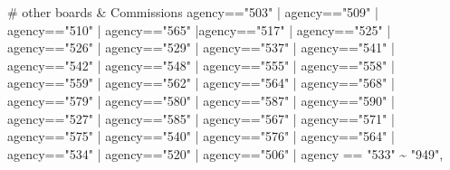 \documentclass[
  letterpaper,
  DIV=11,
  numbers=noendperiod]{scrreport}
\newenvironment{Shaded}{\begin{snugshade}}{\end{snugshade}}
\newcommand{\CommentTok}[1]{\textcolor[rgb]{0.37,0.37,0.37}{#1}}
\newcommand{\NormalTok}[1]{\textcolor[rgb]{0.00,0.23,0.31}{#1}}
\newcommand{\SpecialCharTok}[1]{\textcolor[rgb]{0.37,0.37,0.37}{#1}}
\newcommand{\StringTok}[1]{\textcolor[rgb]{0.13,0.47,0.30}{#1}}
\begin{document}
\begin{Shaded}
\begin{Highlighting}[]
    \CommentTok{\# other boards \& Commissions}
\NormalTok{    agency}\SpecialCharTok{==}\StringTok{"503"} \SpecialCharTok{|}\NormalTok{ agency}\SpecialCharTok{==}\StringTok{"509"} \SpecialCharTok{|}\NormalTok{ agency}\SpecialCharTok{==}\StringTok{"510"} \SpecialCharTok{|}\NormalTok{ agency}\SpecialCharTok{==}\StringTok{"565"} \SpecialCharTok{|}\NormalTok{agency}\SpecialCharTok{==}\StringTok{"517"} \SpecialCharTok{|}\NormalTok{ agency}\SpecialCharTok{==}\StringTok{"525"} \SpecialCharTok{|}\NormalTok{ agency}\SpecialCharTok{==}\StringTok{"526"} \SpecialCharTok{|}\NormalTok{ agency}\SpecialCharTok{==}\StringTok{"529"} \SpecialCharTok{|}\NormalTok{ agency}\SpecialCharTok{==}\StringTok{"537"} \SpecialCharTok{|}\NormalTok{ agency}\SpecialCharTok{==}\StringTok{"541"} \SpecialCharTok{|}\NormalTok{ agency}\SpecialCharTok{==}\StringTok{"542"} \SpecialCharTok{|}\NormalTok{ agency}\SpecialCharTok{==}\StringTok{"548"} \SpecialCharTok{|}\NormalTok{  agency}\SpecialCharTok{==}\StringTok{"555"} \SpecialCharTok{|}\NormalTok{ agency}\SpecialCharTok{==}\StringTok{"558"} \SpecialCharTok{|}\NormalTok{ agency}\SpecialCharTok{==}\StringTok{"559"} \SpecialCharTok{|}\NormalTok{ agency}\SpecialCharTok{==}\StringTok{"562"} \SpecialCharTok{|}\NormalTok{ agency}\SpecialCharTok{==}\StringTok{"564"} \SpecialCharTok{|}\NormalTok{ agency}\SpecialCharTok{==}\StringTok{"568"} \SpecialCharTok{|}\NormalTok{ agency}\SpecialCharTok{==}\StringTok{"579"} \SpecialCharTok{|}\NormalTok{ agency}\SpecialCharTok{==}\StringTok{"580"} \SpecialCharTok{|}\NormalTok{ agency}\SpecialCharTok{==}\StringTok{"587"} \SpecialCharTok{|}\NormalTok{ agency}\SpecialCharTok{==}\StringTok{"590"} \SpecialCharTok{|}\NormalTok{ agency}\SpecialCharTok{==}\StringTok{"527"} \SpecialCharTok{|}\NormalTok{ agency}\SpecialCharTok{==}\StringTok{"585"} \SpecialCharTok{|}\NormalTok{ agency}\SpecialCharTok{==}\StringTok{"567"} \SpecialCharTok{|}\NormalTok{ agency}\SpecialCharTok{==}\StringTok{"571"} \SpecialCharTok{|}\NormalTok{ agency}\SpecialCharTok{==}\StringTok{"575"} \SpecialCharTok{|}\NormalTok{ agency}\SpecialCharTok{==}\StringTok{"540"} \SpecialCharTok{|}\NormalTok{ agency}\SpecialCharTok{==}\StringTok{"576"} \SpecialCharTok{|}\NormalTok{ agency}\SpecialCharTok{==}\StringTok{"564"} \SpecialCharTok{|}\NormalTok{ agency}\SpecialCharTok{==}\StringTok{"534"} \SpecialCharTok{|}\NormalTok{ agency}\SpecialCharTok{==}\StringTok{"520"} \SpecialCharTok{|}\NormalTok{ agency}\SpecialCharTok{==}\StringTok{"506"} \SpecialCharTok{|}\NormalTok{ agency }\SpecialCharTok{==} \StringTok{"533"} \SpecialCharTok{\textasciitilde{}} \StringTok{"949"}\NormalTok{, }
    

\end{Highlighting}
\end{Shaded}
\end{document}

